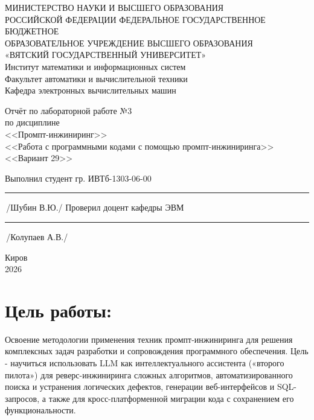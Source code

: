 \documentclass[oneside,a4paper,14pt]{extarticle} %
\begin{document}
	\newpage\thispagestyle{empty}
	\begin{center}
		МИНИСТЕРСТВО НАУКИ И ВЫСШЕГО ОБРАЗОВАНИЯ\\
		РОССИЙСКОЙ ФЕДЕРАЦИИ
		ФЕДЕРАЛЬНОЕ ГОСУДАРСТВЕННОЕ БЮДЖЕТНОЕ\\
		ОБРАЗОВАТЕЛЬНОЕ
		УЧРЕЖДЕНИЕ ВЫСШЕГО ОБРАЗОВАНИЯ\\
		«ВЯТСКИЙ ГОСУДАРСТВЕННЫЙ УНИВЕРСИТЕТ»\\
		Институт математики и информационных систем\\
		Факультет автоматики и вычислительной техники\\
		Кафедра электронных вычислительных машин
	\end{center}
	\vspace{20mm}
	
	\begin{center}
		Отчёт по лабораторной работе №3\\
		по дисциплине\\
		<<Промпт-инжиниринг>>\\
		<<Работа с программными кодами с помощью промпт-инжиниринга>>\\
		<<Вариант 29>>\\
	\end{center}
	\vspace{48mm}
	
	\noindent
	Выполнил студент гр. ИВТб-1303-06-00 \hfill \rule[-0,5mm]{30mm}{0.15mm}\,/Шубин В.Ю./
	\newline
	Проверил доцент кафедры ЭВМ \hfill \rule[-0,5mm]{30mm}{0.15mm}\,/Колупаев А.В./
	
	\vfill
	\begin{center}
		Киров\\
		2026
	\end{center}
	
	\newpage
	\thispagestyle{empty}
	
	\section*{Цель работы:}
	Освоение методологии применения техник промпт-инжиниринга для решения комплексных задач разработки
	и сопровождения программного обеспечения. Цель - научиться использовать LLM как интеллектуального
	ассистента («второго пилота») для реверс-инжиниринга сложных алгоритмов, автоматизированного поиска и
	устранения логических дефектов, генерации веб-интерфейсов и SQL-запросов, а также для кросс-платформенной
	миграции кода с сохранением его функциональности.
\end{document}
